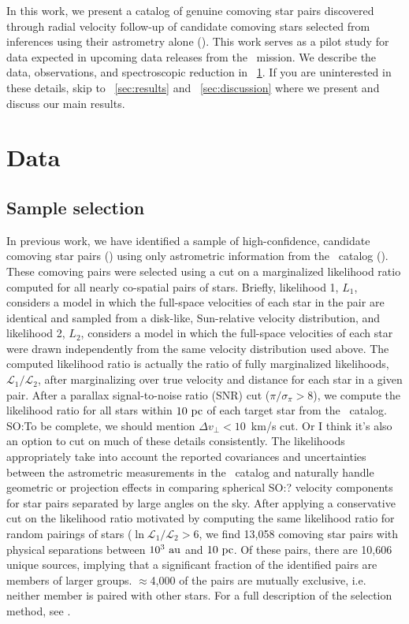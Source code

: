 \documentclass[modern, letterpaper]{aastex61}
\newcommand{\gaia}{\project{Gaia}}
\newcommand{\tgas}{\acronym{TGAS}}
\newcommand{\smoh}[1]{\textcolor{mediumpersianblue}{SO:#1}}
\begin{document}
In this work, we present a catalog of genuine comoving star pairs discovered
through radial velocity follow-up of candidate comoving stars selected from
inferences using their astrometry alone (\citealt{Oh:2017}).
This work serves as a pilot study for data expected in upcoming data releases
from the \gaia\ mission.
We describe the data, observations, and spectroscopic reduction in
\sectionname~\ref{sec:data}.
If you are uninterested in these details, skip to \sectionname~\ref{sec:results}
and \sectionname~\ref{sec:discussion} where we present and discuss our main
results.

\section{Data}\label{sec:data}

\subsection{Sample selection}\label{sec:sample}

In previous work, we have identified a sample of high-confidence, candidate
comoving star pairs (\citealt{Oh:2017}) using only astrometric information from
the \tgas\ catalog (\citealt{Michalik:2015,Gaia-Collaboration:2016a}).
These comoving pairs were selected using a cut on a marginalized likelihood
ratio computed for all nearly co-spatial pairs of stars.
Briefly, likelihood 1, $L_1$, considers a model in which the full-space
velocities of each star in the pair are identical and sampled from a disk-like,
Sun-relative velocity distribution, and likelihood 2, $L_2$, considers a model
in which the full-space velocities of each star were drawn independently from
the same velocity distribution used above. The computed likelihood ratio is
actually the ratio of fully marginalized likelihoods,
$\mathcal{L}_1/\mathcal{L}_2$, after marginalizing over true velocity and
distance for each star in a given pair.
After a parallax signal-to-noise ratio (SNR) cut ($\pi/\sigma_\pi > 8$), we
compute the likelihood ratio for all stars within $10~\mathrm{pc}$ of each target star
from the \tgas\ catalog.
\smoh{To be complete, we should mention $\Delta v_\perp < 10$~km/s cut.
  Or I think it's also an option to cut on much of these details consistently.}
The likelihoods appropriately take into account the reported covariances and
uncertainties between the astrometric measurements in the \tgas\ catalog and
naturally handle geometric or projection effects in comparing spherical \smoh{?}
velocity components for star pairs separated by large angles on the sky.
After applying a conservative cut on the likelihood ratio motivated by computing
the same likelihood ratio for random pairings of stars ($\ln
\mathcal{L}_1/\mathcal{L}_2 > 6$, we find 13,058 comoving star pairs with
physical separations between $10^3~\mathrm{au}$ and $10~\mathrm{pc}$.
Of these pairs, there are 10,606 unique sources, implying that a significant
fraction of the identified pairs are members of larger groups.
$\approx$4,000 of the pairs are mutually exclusive, i.e. neither member is
paired with other stars.
For a full description of the selection method, see \citealt{Oh:2017}.
\end{document}
